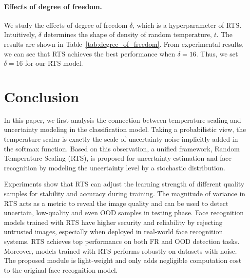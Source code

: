 \documentclass[letterpaper]{article} %
\begin{document}
\paragraph{Effects of degree of freedom.} We study the effects of degree of freedom $\delta$, which is a hyperparameter of RTS. Intuitively, $\delta$ determines the shape of density of random temperature, $t$. The results are shown in Table~\ref{tab:degree_of_freedom}. From experimental results, we can see that RTS achieves the best performance when $\delta = 16$. Thus, we set $\delta = 16$ for our RTS model.



\vspace{-0.99mm}
\section{Conclusion}
\label{sec:conclusion}

In this paper, we first analysis the connection between temperature scaling and uncertainty modeling in the classification model. Taking a probabilistic view, the temperature scalar is exactly the scale of uncertainty noise implicitly added in the softmax function. Based on this observation, a unified framework, Random Temperature Scaling (RTS), is proposed for uncertainty estimation and face recognition by modeling the uncertainty level by a stochastic distribution.

Experiments show that RTS can adjust the learning strength of different quality samples for stability and accuracy during training. The magnitude of variance in RTS acts as a metric to reveal the image quality and can be used to detect uncertain, low-quality and even OOD samples in testing phase.
Face recognition models trained with RTS have higher security and reliability by rejecting untrusted images, especially when deployed in real-world face recognition systems. RTS achieves top performance on both FR and OOD detection tasks. Moreover, models trained with RTS performs robustly on datasets with noise. The proposed module is light-weight and only adds negligible computation cost to the original face recognition model.


\vspace{-0.95mm}
\end{document}
